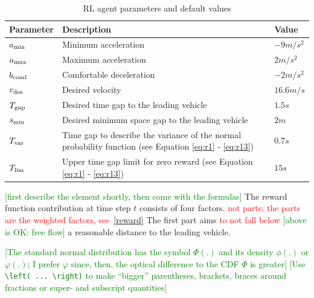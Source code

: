 \documentclass[review]{elsarticle}
\providecommand{\red}[1]{\textcolor{red}{#1}}
\providecommand{\green}[1]{\textcolor{green}{#1}}
\providecommand{\martin}[1]{\red{#1}} %
\providecommand{\martinc}[1]{\green{[#1]}} %
\providecommand{\3}{{\ss}}
\begin{document}
\begin{table}
\caption{RL agent parameters and default values} 
\label{tab:agentParameters} 
\begin{center}
\begin{tabular}{ p{}| p{}| p{}}
	Parameter & Description & Value \\ \hline
	$a_{\rm min}$ & Minimum acceleration & $-9m/s^2$ \\  
	$a_{\rm max}$ & Maximum acceleration & $2m/s^2$ \\  
	$b_{\rm comf}$ & Comfortable deceleration & $-2m/s^2$ \\  
	$v_{\rm des}$ & Desired velocity & $16.6 m/s$ \\  		
	$T_{\rm gap}$ & Desired time gap to the leading vehicle & $1.5s$ \\
	$s_{\rm min}$ & Desired minimum space gap to the leading vehicle & $2m$ \\
	$T_{\rm var}$ & Time gap to describe the variance of the normal probability function (see Equation \ref{eq:r1} - \ref{eq:r13}) & $0.7s$ \\
	$T_{\rm lim}$ & Upper time gap limit for zero reward (see Equation \ref{eq:r1} - \ref{eq:r13}) & $15s$ 
\end{tabular}
\end{center}
\end{table}


\martinc{first describe the element shortly, then come with
    the formulas}
The reward function contribution at time step $t$ consists of four factors. \martin{not parts; the
    parts are the weighted factors, see~\eqref{reward}}
The first part aims \martin{to not fall below} \martinc{above is OK: free flow} a reasonable
distance to the leading vehicle. 

\martinc{The standard normal distribution has the symbol $\Phi(.)$ and
    its density $\phi(.)$ or $\varphi(.)$; I prefer $\varphi$ since, then,
    the optical difference to the CDF $\Phi$ is greater}
\martinc{Use \texttt{\textbackslash left( ... \textbackslash right)}
    to make ``bigger'' parentheses, brackets, braces around fractions
    or super- and subscript quantities}
\end{document}
